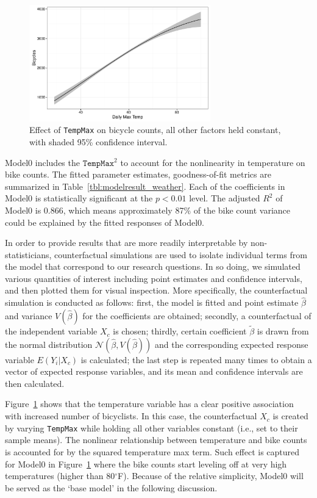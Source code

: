 \documentclass [11pt, proquest] {uwthesis}[2015/03/03]
\begin{document}
\begin{figure}
\centering
   \includegraphics[width=0.7\textwidth]{figures/sim/temperture} 
  \caption{Effect of \texttt{TempMax} on bicycle counts, all other factors held constant, with shaded 95\% confidence interval.}
  \label{fig:temp}
\end{figure}

Model0 includes the $\texttt{TempMax}^2$ to account for the nonlinearity in temperature on bike counts. The fitted parameter estimates, goodness-of-fit metrics are summarized in Table~\ref{tbl:modelresult_weather}. Each of the coefficients in Model0 is statistically significant at the $p<0.01$ level. The adjusted $R^2$ of Model0 is 0.866, which means approximately 87\% of the bike count variance could be explained by the fitted responses of Model0. 

In order to provide results that are more readily interpretable by non-statisticians, counterfactual simulations are used to isolate individual terms from the model that correspond to our research questions. In so doing, we simulated various quantities of interest including point estimates and confidence intervals, and then plotted them for visual inspection. More specifically, the counterfactual simulation is conducted as follows: first, the model is fitted and point estimate $\hat{\beta}$ and variance $V(\hat{\beta})$ for the coefficients are obtained; secondly, a counterfactual of the independent variable $X_c$ is chosen; thirdly, certain coefficient $\tilde{\beta}$ is drawn from the normal distribution $\mathcal{N}(\hat{\beta},V(\hat{\beta}))$ and the corresponding expected response variable $E(Y_i|X_c)$ is calculated; the last step is repeated many times to obtain a vector of expected response variables, and its mean and confidence intervals are then calculated. 

Figure~\ref{fig:temp} shows that the temperature variable has a clear positive association with increased number of bicyclists. In this case, the counterfactual $X_c$ is created by varying \texttt{TempMax} while holding all other variables constant (i.e., set to their sample means). The nonlinear relationship between temperature and bike counts is accounted for by the squared temperature max term. Such effect is captured for Model0 in Figure~\ref{fig:temp} where the bike counts start leveling off at very high temperatures (higher than 80$^\circ$F). Because of the relative simplicity, Model0 will be served as the `base model' in the following discussion. 
\end{document}
